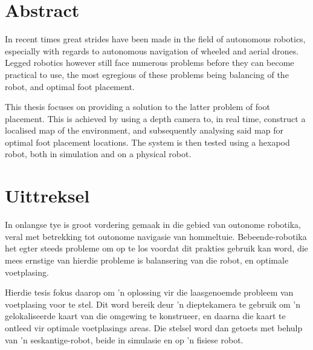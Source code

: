 
\chapter*{Abstract}
In recent times great strides have been made in the field of autonomous robotics, 
especially with regards to autonomous navigation of wheeled and aerial drones.
Legged robotics however still face numerous problems before they can become practical
to use, the most egregious of these problems being balancing of the robot, and optimal foot placement.

This thesis focuses on providing a solution to the latter problem of foot placement. This is achieved by using a depth camera to, in real time, construct a localised map of the environment, and subsequently analysing  said map for optimal foot placement locations. The system is then tested using a hexapod robot, both in simulation and on a physical robot.


\chapter*{Uittreksel}
    In onlangse tye is groot vordering gemaak in die gebied van outonome robotika, 
    veral met betrekking tot outonome navigasie van hommeltuie. Bebeende-robotika het egter steeds probleme om op te los voordat dit prakties gebruik kan word, die mees ernstige van hierdie probleme is balansering van die robot, en optimale voetplasing.

    Hierdie tesis fokus daarop om 'n oplossing vir die laasgenoemde probleem van voetplasing voor te stel. Dit word bereik deur 'n dieptekamera te gebruik  om 'n gelokaliseerde kaart van die omgewing te konstrueer, en daarna die kaart te ontleed vir optimale voetplasings areas. Die stelsel word dan getoets met behulp van 'n seskantige-robot, beide in simulasie en op 'n fisiese robot.
